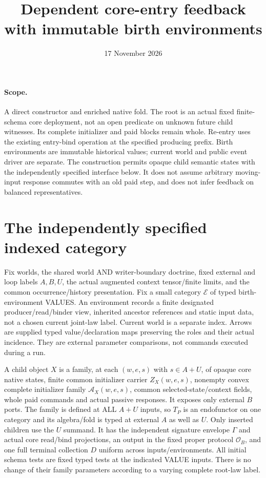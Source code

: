 \documentclass[11pt]{article}
\title{Dependent core-entry feedback with immutable birth environments}
\date{17 November 2026}
\begin{document}
\maketitle
\paragraph{Scope.} A direct constructor and enriched native fold. The root is an actual fixed finite-schema core deployment, not an open predicate on unknown future child witnesses. Its complete initializer and paid blocks remain whole. Re-entry uses the existing entry-bind operation at the specified producing prefix. Birth environments are immutable historical values; current world and public event driver are separate. The construction permits opaque child semantic states with the independently specified interface below. It does not assume arbitrary moving-input response commutes with an old paid step, and does not infer feedback on balanced representatives.

\section{The independently specified indexed category}
Fix worlds, the shared world AND writer-boundary doctrine, fixed external and loop labels $A,B,U$, the actual augmented context tensor/finite limits, and the common occurrence/history presentation. Fix a small category $\mathcal E$ of typed birth-environment VALUES. An environment records a finite designated producer/read/binder view, inherited ancestor references and static input data, not a chosen current joint-law label. Current world is a separate index. Arrows are supplied typed value/declaration maps preserving the roles and their actual incidence. They are external parameter comparisons, not commands executed during a run.

A child object $X$ is a family, at each $(w,e,s)$ with $s\in A+U$, of opaque core native states, finite common initializer carrier $Z_X(w,e,s)$, nonempty convex complete initializer family $\mathcal A_X(w,e,s)$, common selected-state/context fields, whole paid commands and actual passive responses. It exposes only external $B$ ports. The family is defined at ALL $A+U$ inputs, so $T_P$ is an endofunctor on one category and its algebra/fold is typed at external $A$ as well as $U$. Only inserted children use the $U$ summand. It has the independent signature envelope $\Gamma$ and actual core read/bind projections, an output in the fixed proper protocol $\mathcal O_B$, and one full terminal collection $D$ uniform across inputs/environments. All initial schema tests are fixed typed tests at the indicated VALUE inputs. There is no change of their family parameters according to a varying complete root-law label.
\end{document}
